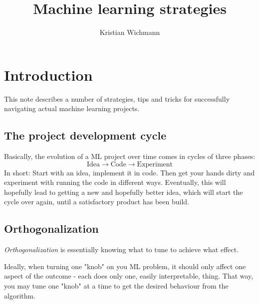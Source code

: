 \documentclass[12pt, a4paper]{article}
\title{Machine learning strategies}
\author{Kristian Wichmann}
\numberwithin{equation}{section}
\begin{document}
\maketitle

\section{Introduction}
This note describes a number of strategies, tips and tricks for successfully navigating actual machine learning projects.

\subsection{The project development cycle}
Basically, the evolution of a ML project over time comes in cycles of three phases:
\begin{equation}
\textrm{Idea}\rightarrow\textrm{Code}\rightarrow\textrm{Experiment}
\end{equation}
In short: Start with an idea, implement it in code. Then get your hands dirty and experiment with running the code in different ways. Eventually, this will hopefully lead to getting a new and hopefully better idea, which will start the cycle over again, until a satisfactory product has been build.

\subsection{Orthogonalization}
\textit{Orthogonalization} is essentially knowing what to tune to achieve what effect.

Ideally, when turning one "knob" on you ML problem, it should only affect one aspect of the outcome - each does only one, easily interpretable, thing. That way, you may tune one "knob" at a time to get the desired behaviour from the algorithm.
\end{document}
